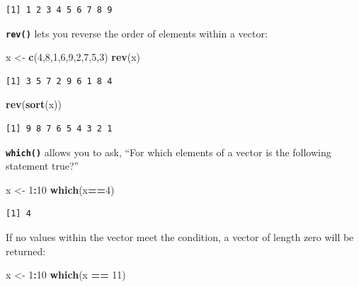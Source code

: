 \documentclass[
]{book}
\newenvironment{Shaded}{\begin{snugshade}}{\end{snugshade}}
\newcommand{\DecValTok}[1]{\textcolor[rgb]{0.00,0.00,0.81}{#1}}
\newcommand{\KeywordTok}[1]{\textcolor[rgb]{0.13,0.29,0.53}{\textbf{#1}}}
\newcommand{\NormalTok}[1]{#1}
\newcommand{\OperatorTok}[1]{\textcolor[rgb]{0.81,0.36,0.00}{\textbf{#1}}}
\newcommand{\StringTok}[1]{\textcolor[rgb]{0.31,0.60,0.02}{#1}}
\begin{document}
\begin{verbatim}
[1] 1 2 3 4 5 6 7 8 9
\end{verbatim}

\textbf{\texttt{rev()}} lets you reverse the order of elements within a vector:

\begin{Shaded}
\begin{Highlighting}[]
\NormalTok{x <-}\StringTok{ }\KeywordTok{c}\NormalTok{(}\DecValTok{4}\NormalTok{,}\DecValTok{8}\NormalTok{,}\DecValTok{1}\NormalTok{,}\DecValTok{6}\NormalTok{,}\DecValTok{9}\NormalTok{,}\DecValTok{2}\NormalTok{,}\DecValTok{7}\NormalTok{,}\DecValTok{5}\NormalTok{,}\DecValTok{3}\NormalTok{)}
\KeywordTok{rev}\NormalTok{(x)}
\end{Highlighting}
\end{Shaded}

\begin{verbatim}
[1] 3 5 7 2 9 6 1 8 4
\end{verbatim}

\begin{Shaded}
\begin{Highlighting}[]
\KeywordTok{rev}\NormalTok{(}\KeywordTok{sort}\NormalTok{(x))}
\end{Highlighting}
\end{Shaded}

\begin{verbatim}
[1] 9 8 7 6 5 4 3 2 1
\end{verbatim}

\textbf{\texttt{which()}} allows you to ask, ``For which elements of a vector is the following statement true?''

\begin{Shaded}
\begin{Highlighting}[]
\NormalTok{x <-}\StringTok{ }\DecValTok{1}\OperatorTok{:}\DecValTok{10}
\KeywordTok{which}\NormalTok{(x}\OperatorTok{==}\DecValTok{4}\NormalTok{)}
\end{Highlighting}
\end{Shaded}

\begin{verbatim}
[1] 4
\end{verbatim}

If no values within the vector meet the condition, a vector of length zero will be returned:

\begin{Shaded}
\begin{Highlighting}[]
\NormalTok{x <-}\StringTok{ }\DecValTok{1}\OperatorTok{:}\DecValTok{10}
\KeywordTok{which}\NormalTok{(x }\OperatorTok{==}\StringTok{ }\DecValTok{11}\NormalTok{)}
\end{Highlighting}
\end{Shaded}
\end{document}
